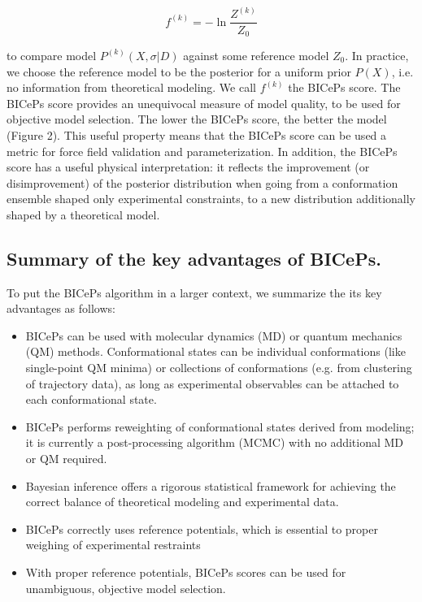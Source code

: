 \[f^{(k)} = -\ln \frac{Z^{(k)}}{Z_0}\]

to compare model \(P^{(k)}(X,\sigma|D)\) against some reference model
\(Z_0\). In practice, we choose the reference model to be the posterior
for a uniform prior \(P(X)\), i.e. no information from theoretical
modeling. We call \(f^{(k)}\) the BICePs score. The BICePs score
provides an unequivocal measure of model quality, to be used for
objective model selection. The lower the BICePs score, the better the
model (Figure 2). This useful property means that the BICePs score can
be used a metric for force field validation and parameterization. In
addition, the BICePs score has a useful physical interpretation: it
reflects the improvement (or disimprovement) of the posterior
distribution when going from a conformation ensemble shaped only
experimental constraints, to a new distribution additionally shaped by a
theoretical model.

\hypertarget{summary-of-the-key-advantages-of-biceps.}{%
\subsection{Summary of the key advantages of
BICePs.}\label{summary-of-the-key-advantages-of-biceps.}}

To put the BICePs algorithm in a larger context, we summarize the its
key advantages as follows:

\begin{itemize}
\tightlist
\item
  BICePs can be used with molecular dynamics (MD) or quantum mechanics
  (QM) methods. Conformational states can be individual conformations
  (like single-point QM minima) or collections of conformations (e.g.
  from clustering of trajectory data), as long as experimental
  observables can be attached to each conformational state.
\item
  BICePs performs reweighting of conformational states derived from
  modeling; it is currently a post-processing algorithm (MCMC) with no
  additional MD or QM required.
\item
  Bayesian inference offers a rigorous statistical framework for
  achieving the correct balance of theoretical modeling and experimental
  data.
\item
  BICePs correctly uses reference potentials, which is essential to
  proper weighing of experimental restraints
\item
  With proper reference potentials, BICePs scores can be used for
  unambiguous, objective model selection.
\end{itemize}


